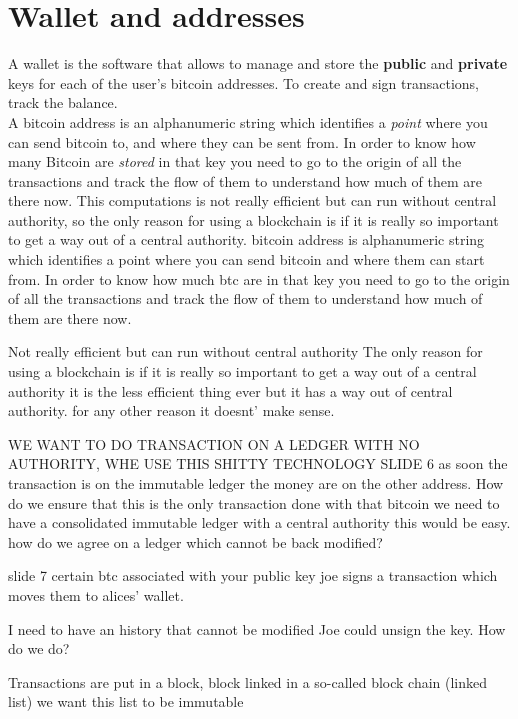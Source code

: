     \section{Wallet and addresses}
        A wallet is the software that allows to manage and store the \textbf{public} and \textbf{private} keys for each of the user's bitcoin addresses. To create and sign transactions, track the balance.\\
        A bitcoin address is an alphanumeric string which identifies a \textit{point} where you can send bitcoin to, and where they can be sent from.
        In order to know how many Bitcoin are \textit{stored} in that key you need to go to the origin of all the transactions and track the flow of them to understand how much of them are there now. This computations is not really efficient but can run without central authority, so the only reason for using a blockchain is if it is really so important to get a way out of a central authority.
\iffalse
    bitcoin address is alphanumeric string which identifies a point where you can send bitcoin
    and where them can start from.
    In order to know how much btc are in that key you need to go to the origin of all the transactions and track the flow of them to understand how much of them are there now.

    Not really efficient but can run without central authority 
    The only reason for using a blockchain is if it is really so important to get a way out of a central authority
    it is the less efficient thing ever but it has a way out of central authority.
    for any other reason it doesnt' make sense.

    WE WANT TO DO TRANSACTION ON A LEDGER WITH NO AUTHORITY, WHE USE THIS SHITTY TECHNOLOGY
SLIDE 6
    as soon the transaction is on the immutable ledger the money are on the other address.
    How do we ensure that this is the only transaction done with that bitcoin 
    we need to have a consolidated immutable ledger
    with a central authority this would be easy.
    how do we agree on a ledger which cannot be back modified?

    slide 7
        certain btc associated with your public key
        joe signs a transaction which moves them to alices' wallet.

        I need to have an history that cannot be modified
            Joe could unsign the key. How do we do?

        Transactions are put in a block, block linked in a so-called block chain (linked list)
        we want this list to be immutable

